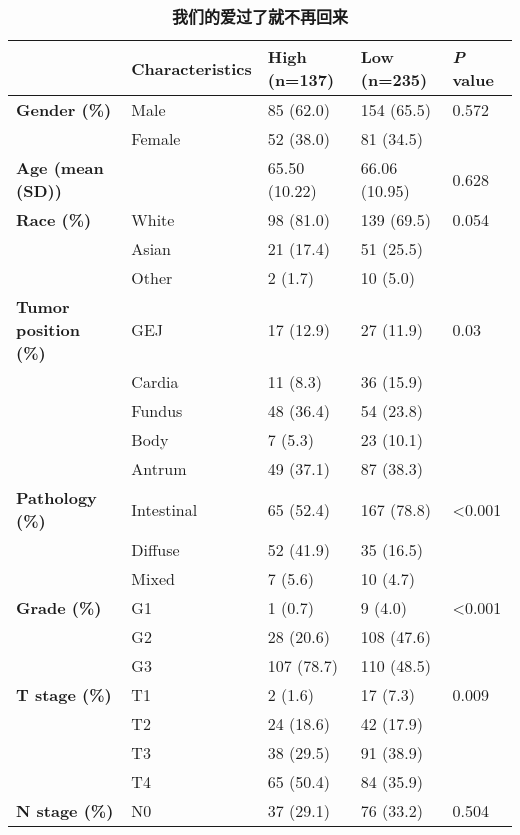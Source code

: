 \begin{table}[htbp]
    \centering
    \fontsize{11}{11}\selectfont
    \caption{\textbf{我们的爱过了就不再回来}}
    \begin{tabular}{lllll}
    \toprule
            & \textbf{Characteristics} & \textbf{High (n=137)} & \textbf{Low (n=235)} & \textbf{\textit{P} value} \\
    \toprule
    \textbf{Gender (\%)} & Male  & 85 (62.0) & 154 (65.5) & 0.572 \\
            & Female & 52 (38.0) & 81 (34.5) &  \\
    \textbf{Age (mean (SD))} &       & 65.50 (10.22) & 66.06 (10.95) & 0.628 \\
    \textbf{Race (\%)} & White & 98 (81.0) & 139 (69.5) & 0.054 \\
            & Asian & 21 (17.4) & 51 (25.5) &  \\
            & Other & 2 (1.7) & 10 (5.0) &  \\
    \textbf{Tumor position (\%)} & GEJ   & 17 (12.9) & 27 (11.9) & 0.03 \\
            & Cardia & 11 (8.3) & 36 (15.9) &  \\
            & Fundus & 48 (36.4) & 54 (23.8) &  \\
            & Body  & 7 (5.3) & 23 (10.1) &  \\
            & Antrum & 49 (37.1) & 87 (38.3) &  \\
    \textbf{Pathology (\%)} & Intestinal & 65 (52.4) & 167 (78.8) & <0.001 \\
            & Diffuse & 52 (41.9) & 35 (16.5) &  \\
            & Mixed & 7 (5.6) & 10 (4.7) &  \\
    \textbf{Grade (\%)} & G1    & 1 (0.7) & 9 (4.0) & <0.001 \\
            & G2    & 28 (20.6) & 108 (47.6) &  \\
            & G3    & 107 (78.7) & 110 (48.5) &  \\
    \textbf{T stage (\%)} & T1    & 2 (1.6) & 17 (7.3) & 0.009 \\
            & T2    & 24 (18.6) & 42 (17.9) &  \\
            & T3    & 38 (29.5) & 91 (38.9) &  \\
            & T4    & 65 (50.4) & 84 (35.9) &  \\
    \textbf{N stage (\%)} & N0    & 37 (29.1) & 76 (33.2) & 0.504 \\

\end{tabular}
\end{table}
